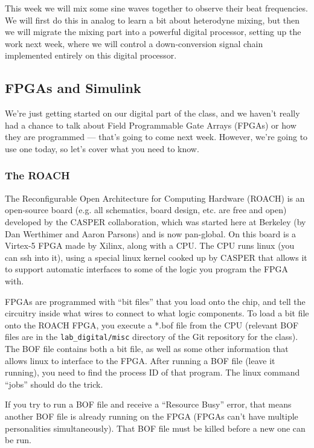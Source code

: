 \documentclass[11pt]{article}
\begin{document}
This week we will mix some sine waves together to observe their beat frequencies.  We will first do this
in analog to learn a bit about heterodyne mixing, but then we will migrate the mixing part into a powerful
digital processor, setting up the work next week, where we will control a down-conversion signal
chain implemented entirely on this digital processor.

\subsection*{FPGAs and Simulink}

We're just getting started on our digital part of the class, and we haven't really had a chance to talk
about Field Programmable Gate Arrays (FPGAs) or how they are programmed --- that's going to come next
week.  However, we're going to use one today, so let's cover what you need to know.

\subsubsection*{The ROACH}

The Reconfigurable Open Architecture for Computing Hardware (ROACH) is an open-source board (e.g.
all schematics, board design, etc. are free and open) developed by the CASPER collaboration, which
was started here at Berkeley (by Dan Werthimer and Aaron Parsons) and is now pan-global.  
On this board is a Virtex-5 FPGA made by Xilinx, along with a CPU.  The CPU
runs linux (you can ssh into it), using a special linux kernel cooked up by CASPER that allows it to support 
automatic interfaces to some of the logic you program the FPGA with.

FPGAs are programmed with ``bit files'' that you load onto the chip, and tell the circuitry inside what
wires to connect to what logic components.  To load a bit file onto the ROACH FPGA, you execute a *.bof file
from the CPU (relevant BOF files are in the \verb+lab_digital/misc+ directory of the Git repository for
the class).  The BOF file contains both a bit file, as well as some other information that allows
linux to interface to the FPGA.  After running a BOF file (leave it running), you need to find the 
process ID of that program.  The linux command ``jobs'' should do the trick.

If you try to run a BOF file and receive a ``Resource Busy'' error, that means another BOF file is
already running on the FPGA (FPGAs can't have multiple personalities simultaneously).  That BOF file
must be killed before a new one can be run.
\end{document}
